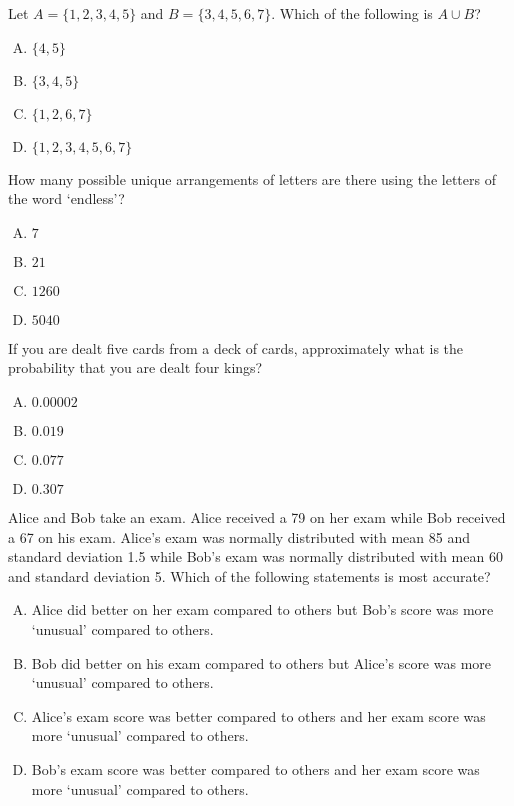 \documentclass[12pt,letterpaper]{exam}
\begin{document}
\examtitle
{} 


\newpage

\begin{questions}

\question Let $A= \{ 1, 2, 3, 4, 5 \}$ and $B= \{ 3, 4, 5, 6, 7 \}$. Which of the following is $A \cup B$?
	\begin{enumerate}[A.]
	\item $\{ 4, 5 \}$
	\item $\{ 3, 4, 5 \}$
	\item $\{ 1, 2, 6, 7 \}$
	\item $\{ 1, 2, 3, 4, 5, 6, 7 \}$
	\end{enumerate}

\question How many possible unique arrangements of letters are there using the letters of the word `endless'?
	\begin{enumerate}[A.]
	\item $7$
	\item $21$
	\item $1260$
	\item $5040$
	\end{enumerate}

\question If you are dealt five cards from a deck of cards, approximately what is the probability that you are dealt four kings?
	\begin{enumerate}[A.]
	\item $0.00002$
	\item $0.019$
	\item $0.077$
	\item $0.307$
	\end{enumerate}

\question Alice and Bob take an exam. Alice received a 79 on her exam while Bob received a 67 on his exam. Alice's exam was normally distributed with mean 85 and standard deviation 1.5 while Bob's exam was normally distributed with mean 60 and standard deviation 5. Which of the following statements is most accurate?
	\begin{enumerate}[A.]
	\item Alice did better on her exam compared to others but Bob's score was more `unusual' compared to others. 
	\item Bob did better on his exam compared to others but Alice's score was more `unusual' compared to others. 
	\item Alice's exam score was better compared to others and her exam score was more `unusual' compared to others. 
	\item Bob's exam score was better compared to others and her exam score was more `unusual' compared to others. 
	\end{enumerate}


\end{questions}
\end{document}

